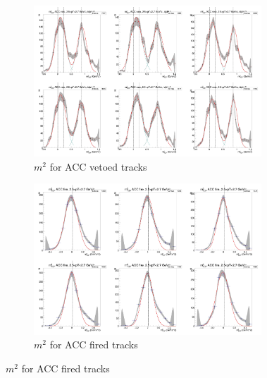 \begin{figure}[H]
  \ContinuedFloat
    \begin{subfigure}{1\textwidth}
   \centering
   \includegraphics[width=0.94\textwidth]{hiptfits/pos/PSm2_cent0_ich1_accfire0_ptbin10.jpg}
    \caption{$m^2$ for ACC vetoed tracks}
    \end{subfigure}
    \begin{subfigure}{1\textwidth}
   \centering
   \includegraphics[width=0.94\textwidth]{hiptfits/pos/PSm2_cent0_ich1_accfire1_ptbin10.jpg}
    \caption{$m^2$ for ACC fired tracks}
    \end{subfigure}  
\end{figure}
